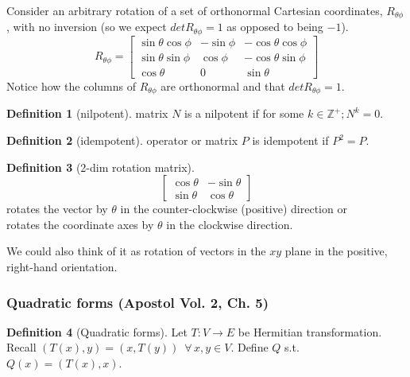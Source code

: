 \documentclass[twoside]{amsart}
\theoremstyle{plain}
\theoremstyle{definition}
\newtheorem{definition}{Definition}
\begin{document}
Consider an arbitrary rotation of a set of orthonormal Cartesian coordinates, $R_{ \theta \phi}$, with no inversion (so we expect $det R_{\theta \phi} = 1$ as opposed to being $-1$).  
\begin{equation}
  R_{\theta \phi} = \left[ 
    \begin{matrix} 
      \sin{\theta} \cos{\phi} & - \sin{\phi} & -\cos{\theta} \cos{\phi} \\ 
      \sin{\theta} \sin{\phi} &  \cos{\phi} & - \cos{\theta} \sin{\phi} \\ 
      \cos{\theta} & 0 & \sin{\theta} 
    \end{matrix}
    \right]
\end{equation} 
Notice how the columns of $R_{\theta \phi}$ are orthonormal and that  $det R_{\theta \phi} = 1$.  

\begin{definition}[nilpotent]
  matrix $N$ is a nilpotent if for some $k \in \mathbb{Z}^+ ; N^k = 0 $.  
\end{definition}

\begin{definition}[idempotent]
operator or matrix $P$ is idempotent if $P^2 = P$.  
\end{definition}

\begin{definition}[2-dim rotation matrix]
  \[
  \left[ 
    \begin{matrix}
      \cos{\theta} & -\sin{\theta} \\
      \sin{\theta} & \cos{\theta}
      \end{matrix}
    \right]
  \]
  rotates the vector by $\theta$ in the counter-clockwise (positive) direction or \\
  rotates the coordinate axes by $\theta$ in the clockwise direction.  
  
  We could also think of it as rotation of vectors in the $xy$ plane in the positive, right-hand orientation.  
\end{definition}

\subsubsection{ Quadratic forms (Apostol Vol. 2, Ch. 5)}

\begin{definition}[Quadratic forms] Let $T:V \to E$ be Hermitian transformation.  Recall $(T(x),y) = (x,T(y))$\, $\forall \, x,y \in V$.  Define $Q$ s.t. $Q(x) = (T(x),x)$.  
\end{definition}
\end{document}
